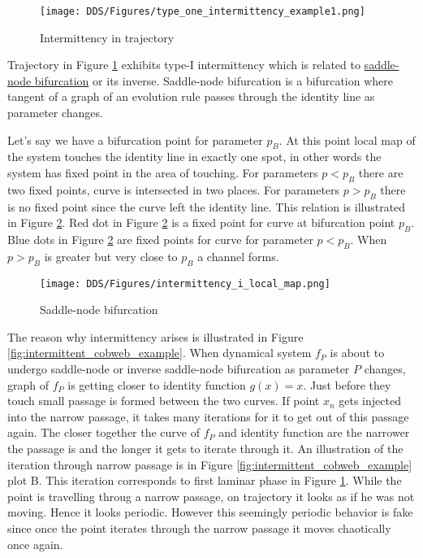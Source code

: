 \begin{figure}[!h]
    \centering
    \texttt{[image: DDS/Figures/type\_one\_intermittency\_example1.png]}
    \caption{Intermittency in trajectory}
    \label{fig:intermittent_trajectory_example}
\end{figure}

Trajectory in Figure \ref{fig:intermittent_trajectory_example} exhibits type-I intermittency which is related to \hyperref[def:saddle_node_bif]{saddle-node bifurcation} or its inverse.
Saddle-node bifurcation is a bifurcation where tangent of a graph of an evolution rule passes through the identity line as parameter changes.
\par
Let's say we have a bifurcation point for parameter $p_{B}$.
At this point local map of the system touches the identity line in exactly one spot, in other words the system has fixed point in the area of touching.
For parameters $p < p_{B}$ there are two fixed points, curve is intersected in two places.
For parameters $p > p_{B}$ there is no fixed point since the curve left the identity line.
This relation is illustrated in Figure \ref{fig:saddle_node_bifurcation}.
Red dot in Figure \ref{fig:saddle_node_bifurcation} is a fixed point for curve at bifurcation point $p_{B}$.
Blue dots in Figure \ref{fig:saddle_node_bifurcation} are fixed points for curve for parameter $p < p_{B}$.
When $p > p_{B}$ is greater but very close to $p_{B}$ a channel forms.
\begin{figure}[!h]
    \centering
    \texttt{[image: DDS/Figures/intermittency\_i\_local\_map.png]}
    \caption{Saddle-node bifurcation}
    \label{fig:saddle_node_bifurcation}
\end{figure}


The reason why intermittency arises is illustrated in Figure \ref{fig:intermittent_cobweb_example}.
When dynamical system $f_P$ is about to undergo saddle-node or inverse saddle-node bifurcation as parameter $P$ changes, graph of $f_P$ is getting closer to identity function $g(x)=x$.
Just before they touch small passage is formed between the two curves.
If point $x_n$ gets injected into the narrow passage, it takes many iterations for it to get out of this passage again.
The closer together the curve of $f_P$ and identity function are the narrower the passage is and the longer it gets to iterate through it.
An illustration of the iteration through narrow passage is in Figure \ref{fig:intermittent_cobweb_example} plot B.
This iteration corresponds to first laminar phase in Figure \ref{fig:intermittent_trajectory_example}.
While the point is travelling throug a narrow passage, on trajectory it looks as if he was not moving.
Hence it looks periodic.
However this seemingly periodic behavior is fake since once the point iterates through the narrow passage it moves chaotically once again.


